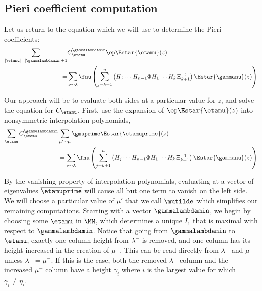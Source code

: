     \subsection{Pieri coefficient computation}\label{Piericomputation}
Let us return to the equation which we will use to determine the Pieri coefficients:
\begin{align}\label{evaluatethis}\sum_{|\etamu| = |\gammalambdamin| + 1} &C^{\gammalambdamin}_{\etamu} \ep \Estar{\etamu}(z)\nonumber \\ = &\sum_{\nu \sim \lambda} \fnu \left( \sum_{j=k+1}^n \left( H_j \dotsm H_{n-1} \Phi H_1 \dotsm H_{k} \, \Xi_{k+1}^{-1} \right)  \Estar{\gammanu}(z)\right)\end{align}

Our approach will be to evaluate both sides at a particular value for $z$, and solve the equation for $C_{\etamu}$. First, use the expansion of $\ep \Estar{\etamu}(z)$ into nonsymmetric interpolation polynomials,
\begin{align}\label{evaluationpoint}\sum_{\etamu}  C^{\gammalambdamin}_{\etamu} &\sum_{\mu' \sim \mu} \gmuprime \Estar{\etamuprime}(z)\nonumber\\
&= \sum_{\nu \sim \lambda} \fnu \left( \sum_{j=k+1}^n \left( H_j \dotsm H_{n-1} \Phi H_1 \dotsm H_{k} \, \Xi_{k+1}^{-1} \right)  \Estar{\gammanu}(z)\right)\end{align}

By the vanishing property of interpolation polynomials, evaluating at a vector of eigenvalues $\overline{\etamuprime}$ will cause all but one term to vanish on the left side. We will choose a particular value of $\mu'$ that we call $\mutilde$ which simplifies our remaining computations. Starting with a vector $\gammalambdamin$, we begin by choosing some $\etamu$ in $\MM$, which determines a unique $I_1$ that is maximal with respect to $\gammalambdamin$. Notice that going from $\gammalambdamin$ to $\etamu$, exactly one column height from $\lambda^-$ is removed, and one column has its height increased in the creation of $\mu^-$. This can be read directly from $\lambda^-$ and $\mu^-$ unless $\lambda^-=\mu^-$. If this is the case, both the removed $\lambda^-$ column and the increased $\mu^-$ column have a height $\gamma_i$ where $i$ is the largest value for which $\gamma_i \neq \eta_i$.

